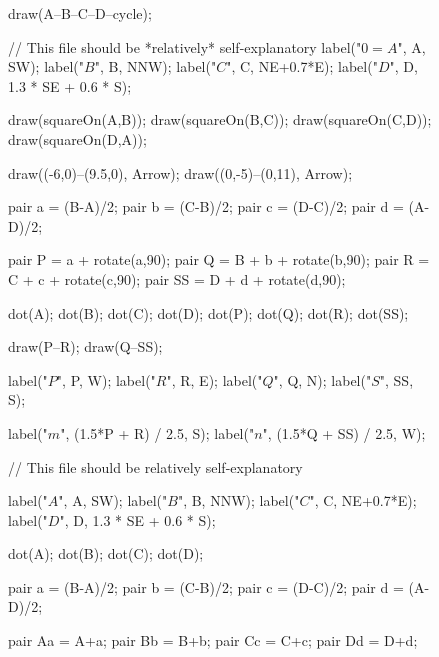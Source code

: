 \documentclass[../textbook.tex]{subfiles}
\begin{document}
\begin{figure}[h]
	\begin{center}
		\begin{minipage}[b]{0.55\textwidth}
			\centering
			\begin{asy}[width=0.9\textwidth]
				draw(A--B--C--D--cycle);

				// This file should be *relatively* self-explanatory
				label("$0=A$", A, SW);
				label("$B$", B, NNW);
				label("$C$", C, NE+0.7*E);
				label("$D$", D, 1.3 * SE + 0.6 * S);

				draw(squareOn(A,B));
				draw(squareOn(B,C));
				draw(squareOn(C,D));
				draw(squareOn(D,A));

				draw((-6,0)--(9.5,0), Arrow);
				draw((0,-5)--(0,11), Arrow);

				pair a = (B-A)/2;
				pair b = (C-B)/2;
				pair c = (D-C)/2;
				pair d = (A-D)/2;

				pair P = a + rotate(a,90);
				pair Q = B + b + rotate(b,90);
				pair R = C + c + rotate(c,90);
				pair SS = D + d + rotate(d,90);

				dot(A);
				dot(B);
				dot(C);
				dot(D);
				dot(P);
				dot(Q);
				dot(R);
				dot(SS);

				draw(P--R);
				draw(Q--SS);

				label("$P$", P, W);
				label("$R$", R, E);
				label("$Q$", Q, N);
				label("$S$", SS, S);

				label("$m$", (1.5*P + R) / 2.5, S);
				label("$n$", (1.5*Q + SS) / 2.5, W);

			\end{asy}
		\end{minipage}
		\hfill
		\begin{minipage}[b]{0.35\textwidth}
			\begin{center}
				\begin{minipage}[b]{\textwidth}
					\centering
					\begin{asy}[width=0.6\textwidth]
						// This file should be relatively self-explanatory

						label("$A$", A, SW);
						label("$B$", B, NNW);
						label("$C$", C, NE+0.7*E);
						label("$D$", D, 1.3 * SE + 0.6 * S);

						dot(A);
						dot(B);
						dot(C);
						dot(D);

						pair a = (B-A)/2;
						pair b = (C-B)/2;
						pair c = (D-C)/2;
						pair d = (A-D)/2;

						pair Aa = A+a;
						pair Bb = B+b;
						pair Cc = C+c;
						pair Dd = D+d;


\end{asy}
\end{minipage}
\end{center}
\end{minipage}
\end{center}
\end{figure}
\end{document}
